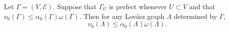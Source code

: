 Let $\Gamma = (V, \mathcal{E})$. Suppose that $\Gamma_U$ is perfect whenever $U \subset V$ and that $\nu_0(\Gamma) \leq \alpha_0(\Gamma)\omega(\Gamma)$. Then for any Lovász graph $\Lambda$ determined by $\Gamma$,
$$\nu_0(\Lambda) \leq \alpha_0(\Lambda)\omega(\Lambda).$$
